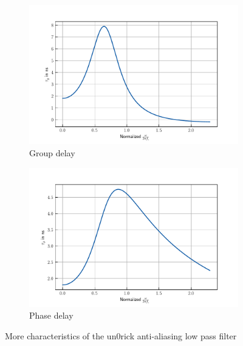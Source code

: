 \documentclass{article}
\begin{document}
\begin{figure}
\begin{subfigure}[b]{0.475\textwidth}
		\centering
		\includegraphics[width=\textwidth]{Images/pdf/un0rick_aa_filter_group_delay}
		\caption{\centering Group delay}
		\label{fig:un0rick_aa_filter_group_delay}
	\end{subfigure}
	\hfill
		\begin{subfigure}[b]{0.475\textwidth}
		\centering
		\includegraphics[width=\textwidth]{Images/pdf/un0rick_aa_filter_phase_delay}
		\caption{\centering Phase delay}
		\label{fig:un0rick_aa_filter_phase_delay}
	\end{subfigure}

	\caption{\centering More characteristics of the un0rick anti-aliasing low pass filter} 
	\label{fig:un0rick_aa_characteristics}
\end{figure}
\end{document}
